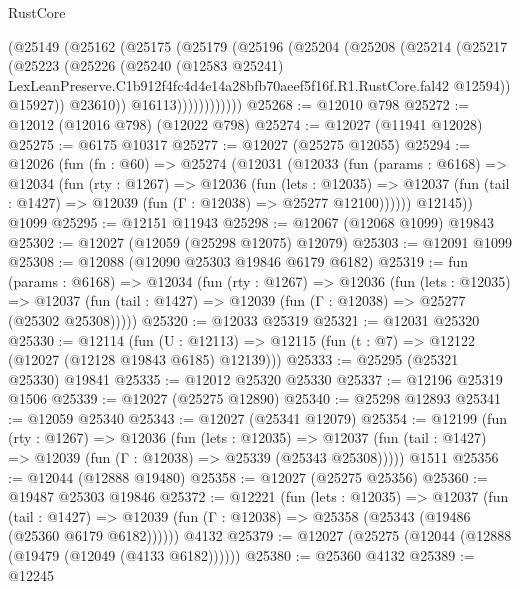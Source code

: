 \begin{lexlean}{RustCore}
\begin{coremodule}
                (@25149
                  (@25162
                    (@25175
                      (@25179
                        (@25196
                          (@25204
                            (@25208
                              (@25214
                                (@25217
                                  (@25223
                                    (@25226
                                      (@25240
                                        (@12583 @25241)
                                        LexLeanPreserve.C1b912f4fc4d4e14a28bfb70aeef5f16f.R1.RustCore.fal42
                                        @12594))
                                    @15927))
                                @23610))
                            @16113))))))))))))
@25268 := @12010 @798
@25272 := @12012 (@12016 @798) (@12022 @798)
@25274 := @12027 (@11941 @12028)
@25275 := @6175 @10317
@25277 := @12027 (@25275 @12055)
@25294 := @12026
    (fun (fn : @60) =>
    @25274
      (@12031
        (@12033
          (fun (params : @6168) =>
          @12034
            (fun (rty : @1267) =>
            @12036
              (fun (lets : @12035) =>
              @12037 (fun (tail : @1427) => @12039 (fun (Γ : @12038) => @25277 @12100))))))
        @12145))
    @1099
@25295 := @12151 @11943
@25298 := @12067 (@12068 @1099) @19843
@25302 := @12027 (@12059 (@25298 @12075) @12079)
@25303 := @12091 @1099
@25308 := @12088 (@12090 @25303 @19846 @6179 @6182)
@25319 := fun (params : @6168) =>
  @12034
    (fun (rty : @1267) =>
    @12036
      (fun (lets : @12035) =>
      @12037 (fun (tail : @1427) => @12039 (fun (Γ : @12038) => @25277 (@25302 @25308)))))
@25320 := @12033 @25319
@25321 := @12031 @25320
@25330 := @12114
    (fun (U : @12113) => @12115 (fun (t : @7) => @12122 (@12027 (@12128 @19843 @6185) @12139)))
@25333 := @25295 (@25321 @25330) @19841
@25335 := @12012 @25320 @25330
@25337 := @12196 @25319 @1506
@25339 := @12027 (@25275 @12890)
@25340 := @25298 @12893
@25341 := @12059 @25340
@25343 := @12027 (@25341 @12079)
@25354 := @12199
    (fun (rty : @1267) =>
    @12036
      (fun (lets : @12035) =>
      @12037 (fun (tail : @1427) => @12039 (fun (Γ : @12038) => @25339 (@25343 @25308)))))
    @1511
@25356 := @12044 (@12888 @19480)
@25358 := @12027 (@25275 @25356)
@25360 := @19487 @25303 @19846
@25372 := @12221
    (fun (lets : @12035) =>
    @12037
      (fun (tail : @1427) =>
      @12039 (fun (Γ : @12038) => @25358 (@25343 (@19486 (@25360 @6179 @6182))))))
    @4132
@25379 := @12027 (@25275 (@12044 (@12888 (@19479 (@12049 (@4133 @6182))))))
@25380 := @25360 @4132
@25389 := @12245

\end{coremodule}
\end{lexlean}

